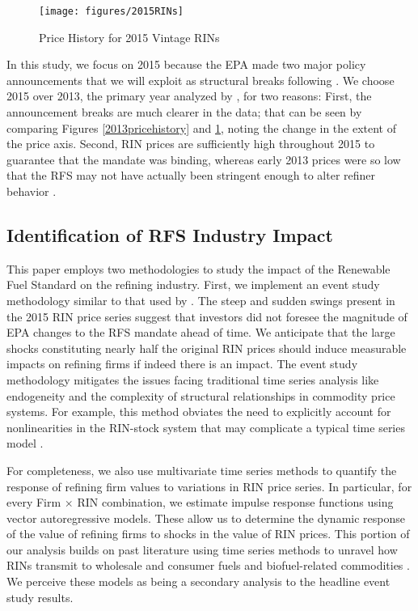\documentclass[11pt]{article}
\begin{document}
\begin{figure}[h]
	\caption{Price History for 2015 Vintage RINs}
	\label{2015pricehistory}
	\texttt{[image: figures/2015RINs]}
\end{figure}

In this study, we focus on 2015 because the EPA made two major policy announcements that we will exploit as structural breaks following \cite{Lade2018a}. We choose 2015 over 2013, the primary year analyzed by \cite{Lade2018a}, for two reasons: First, the announcement breaks are much clearer in the data; that can be seen by comparing Figures \ref{2013pricehistory} and \ref{2015pricehistory}, noting the change in the extent of the price axis. Second, RIN prices are sufficiently high throughout 2015 to guarantee that the mandate was binding, whereas early 2013 prices were so low that the RFS may not have actually been stringent enough to alter refiner behavior \citep{Whistance2016}.

\subsection{Identification of RFS Industry Impact}

This paper employs two methodologies to study the impact of the Renewable Fuel Standard on the refining industry. First, we implement an event study methodology similar to that used by \cite{Lade2018a}. The steep and sudden swings present in the 2015 RIN price series suggest that investors did not foresee the magnitude of EPA changes to the RFS mandate ahead of time. We anticipate that the large shocks constituting nearly half the original RIN prices should induce measurable impacts on refining firms if indeed there is an impact. The event study methodology mitigates the issues facing traditional time series analysis like endogeneity and the complexity of structural relationships in commodity price systems. For example, this method obviates the need to explicitly account for nonlinearities in the RIN-stock system that may complicate a typical time series model \citep{Serra2011}.

For completeness, we also use multivariate time series methods to quantify the response of refining firm values to variations in RIN price series. In particular, for every Firm $\times$ RIN combination, we estimate impulse response functions using vector autoregressive models. These allow us to determine the dynamic response of the value of refining firms to shocks in the value of RIN prices. This portion of our analysis builds on past literature using time series methods to unravel how RINs transmit to wholesale and consumer fuels \citep{Knittel2017} and biofuel-related commodities \citep{Whistance2014, Whistance2016}. We perceive these models as being a secondary analysis to the headline event study results.
\end{document}
